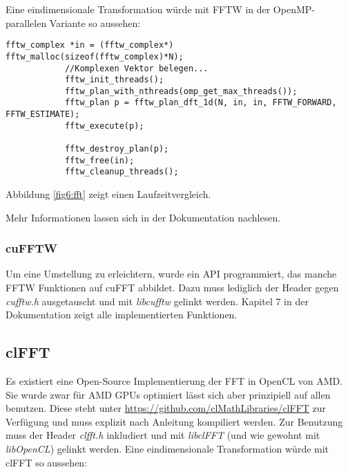 		 	Eine eindimensionale Transformation würde mit FFTW in der OpenMP-parallelen Variante so aussehen:
		 	\begin{lstlisting}[caption=FFTW Beispiel] 
		 	fftw_complex *in = (fftw_complex*) fftw_malloc(sizeof(fftw_complex)*N);
		 	//Komplexen Vektor belegen...
			fftw_init_threads();
			fftw_plan_with_nthreads(omp_get_max_threads());	
			fftw_plan p = fftw_plan_dft_1d(N, in, in, FFTW_FORWARD, FFTW_ESTIMATE); 
			fftw_execute(p); 
			
			fftw_destroy_plan(p);
			fftw_free(in);
			fftw_cleanup_threads();	 	
		 	\end{lstlisting}
		 	
			Abbildung \ref{fig6:fft} zeigt einen Laufzeitvergleich.
		
			Mehr Informationen lassen sich in der Dokumentation nachlesen. \autocite{fftwDoc}
			
			\subsubsection{cuFFTW}
			Um eine Umstellung zu erleichtern, wurde ein \Gls{API} programmiert, das manche FFTW Funktionen auf cuFFT abbildet. Dazu muss lediglich der Header gegen \textit{cufftw.h} ausgetauscht und mit \textit{libcufftw} gelinkt werden. Kapitel 7 in der Dokumentation zeigt alle implementierten Funktionen. \autocite{cufftDoc}		
			
		\subsection{clFFT}
		Es existiert eine Open-Source Implementierung der FFT in OpenCL von AMD. Sie wurde zwar für AMD GPUs optimiert lässt sich aber prinzipiell auf allen benutzen. Diese steht unter \url{https://github.com/clMathLibraries/clFFT} zur Verfügung und muss explizit nach Anleitung kompiliert werden. Zur Benutzung muss der Header \textit{clfft.h} inkludiert und mit \textit{libclFFT} (und wie gewohnt mit \textit{libOpenCL}) gelinkt werden. Eine eindimensionale Transformation würde mit clFFT so aussehen:
		
		\newpage
		
